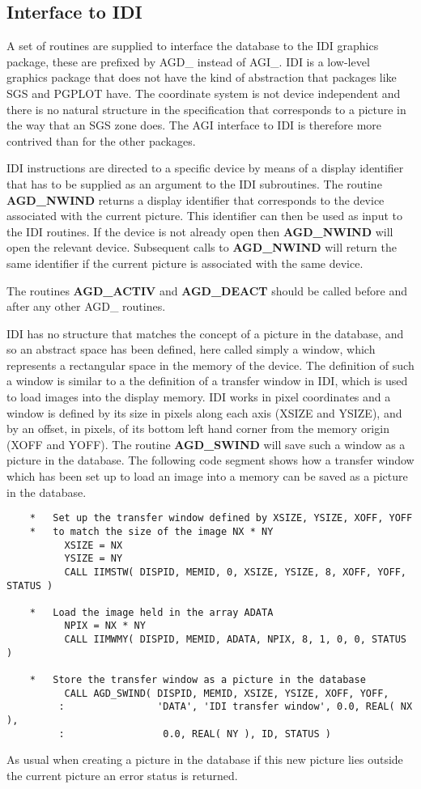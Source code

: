 \subsection{Interface to IDI}

A set of routines are supplied to interface the database to the IDI graphics
package, these are prefixed by AGD\_ instead of AGI\_. IDI is a low-level
graphics package that does not have the kind of abstraction that packages
like SGS and PGPLOT have. The coordinate system is not device independent
and there is no natural structure in the specification that corresponds to
a picture in the way that an SGS zone does. The AGI interface to IDI is
therefore more contrived than for the other packages.

IDI instructions are directed to a specific device by means of a display
identifier that has to be supplied as an argument to the IDI subroutines.
The routine {\bf AGD\_NWIND} returns a display identifier that corresponds
to the device associated with the current picture. This identifier can
then be used as input to the IDI routines. If the device is not already
open then {\bf AGD\_NWIND} will open the relevant device. Subsequent calls
to {\bf AGD\_NWIND} will return the same identifier if the current picture
is associated with the same device.

The routines {\bf AGD\_ACTIV} and {\bf AGD\_DEACT} should be called before
and after any other AGD\_ routines.

IDI has no structure that matches the concept of a picture in the database,
and so an abstract space has been defined, here called simply a window, which
represents a rectangular space in the memory of the device. The definition
of such a window is similar to a the definition of a transfer window in IDI,
which is used to load images into the display memory.
IDI works in pixel coordinates and a window is defined by its size in
pixels along each axis (XSIZE and YSIZE), and by an offset, in pixels,
of its bottom left hand corner from the memory origin (XOFF and YOFF).
The routine {\bf AGD\_SWIND} will save such a window as a picture in the
database. The following code segment shows how a transfer window which has
been set up to load an image into a memory can be saved as a picture in the
database.
\begin{verbatim}
    *   Set up the transfer window defined by XSIZE, YSIZE, XOFF, YOFF
    *   to match the size of the image NX * NY
          XSIZE = NX
          YSIZE = NY
          CALL IIMSTW( DISPID, MEMID, 0, XSIZE, YSIZE, 8, XOFF, YOFF, STATUS )

    *   Load the image held in the array ADATA
          NPIX = NX * NY
          CALL IIMWMY( DISPID, MEMID, ADATA, NPIX, 8, 1, 0, 0, STATUS )

    *   Store the transfer window as a picture in the database
          CALL AGD_SWIND( DISPID, MEMID, XSIZE, YSIZE, XOFF, YOFF,
         :                'DATA', 'IDI transfer window', 0.0, REAL( NX ),
         :                 0.0, REAL( NY ), ID, STATUS )
\end{verbatim}
As usual when creating a picture in the database if this new picture lies
outside the current picture an error status is returned.

